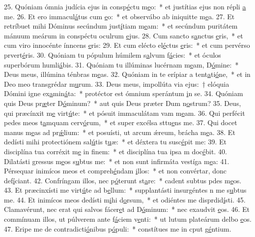 25. Quóniam ómnia judícia ejus in consp\uline{é}ctu m\uline{e}o:~* et justítias ejus non répli \uline{a} me.
26. Et ero immacul\uline{á}tus cum \uline{e}o:~* et observábo ab iniquitte m\uline{e}a.
27. Et retríbuet mihi Dóminus secúndum just\uline{í}tiam m\uline{e}am:~* et secúndum puritátem mánuum meárum in conspéctu oculrum \uline{e}jus.
28. Cum sancto s\uline{a}nctus \uline{e}ris,~* et cum viro innocénte ínncens \uline{e}ris:
29. Et cum elécto el\uline{é}ctus \uline{e}ris:~* et cum pervérso prvert\uline{é}ris.
30. Quóniam tu pópulum húmilem s\uline{a}lvum f\uline{á}cies:~* et óculos superbórum humli\uline{á}bis.
31. Quóniam tu illúminas lucérnam m\uline{e}am, D\uline{ó}mine:~* Deus meus, illúmina ténbras m\uline{e}as.
32. Quóniam in te erípiar a tent\uline{a}ti\uline{ó}ne,~* et in Deo meo transgrédar m\uline{u}rum.
33. Deus meus, impollúta via ejus:~† elóquia Dómini igne ex\uline{a}min\uline{á}ta:~* protéctor est ómnium sperántum \uline{i}n se.
34. Quóniam quis Deus pr\uline{æ}ter D\uline{ó}minum?~* aut quis Deus præter Dum n\uline{o}strum?
35. Deus, qui præcínxit m\uline{e} virt\uline{ú}te:~* et pósuit immaculátam vam m\uline{e}am.
36. Qui perfécit pedes meos t\uline{a}mquam cerv\uline{ó}rum,~* et super excélsa sttu\uline{e}ns me.
37. Qui docet manus m\uline{e}as ad pr\uline{ǽ}lium:~* et posuísti, ut arcum ǽreum, brácha m\uline{e}a.
38. Et dedísti mihi protectiónem sal\uline{ú}tis t\uline{u}æ:~* et déxtera tu susc\uline{é}pit me:
39. Et disciplína tua corréxit m\uline{e} in f\uline{i}nem:~* et disciplína tua ipsa m doc\uline{é}bit.
40. Dilatásti gressus m\uline{e}os s\uline{u}btus me:~* et non sunt infirmáta vestíga m\uline{e}a:
41. Pérsequar inimícos meos et compreh\uline{é}ndam \uline{i}llos:~* et non convértar, donc def\uline{í}ciant.
42. Confríngam illos, nec p\uline{ó}terunt st\uline{a}re:~* cadent subtus pdes m\uline{e}os.
43. Et præcinxísti me virt\uline{ú}te ad b\uline{e}llum:~* supplantásti insurgéntes n me s\uline{u}btus me.
44. Et inimícos meos dedísti m\uline{i}hi d\uline{o}rsum,~* et odiéntes me disprdid\uline{í}sti.
45. Clamavérunt, nec erat qui salvos fácer\uline{e}t ad D\uline{ó}minum:~* nec exaudvit \uline{e}os.
46. Et commínuam illos, ut púlverem ante f\uline{á}ciem v\uline{e}nti:~* ut lutum plateárum delbo \uline{e}os.
47. Eripe me de contradicti\uline{ó}nibus p\uline{ó}puli:~* constítues me in cput g\uline{é}ntium.
